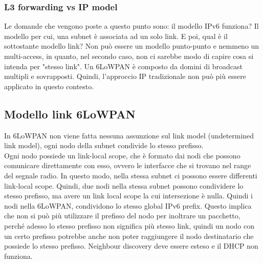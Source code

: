 \documentclass{article}
\begin{document}
\subsubsection{L3 forwarding vs IP model}
Le domande che vengono poste a questo punto sono: il modello IPv6 funziona? Il modello per cui, una subnet è associata ad un solo link. E poi, qual è il sottostante modello link? Non può essere un modello punto-punto e nemmeno un multi-access, in quanto, nel secondo caso, non ci sarebbe modo di capire cosa si intenda per "stesso link". Un 6LoWPAN è composto da domini di broadcast multipli e sovrapposti. Quindi, l'approccio IP tradizionale non può più essere applicato in questo contesto. 

\subsection{Modello link 6LoWPAN}
In 6LoWPAN non viene fatta nessuna assunzione sul link model (undetermined link model), ogni nodo della subnet condivide lo stesso prefisso. \\ Ogni nodo possiede un link-local scope, che è formato dai nodi che possono comunicare direttamente con esso, ovvero le interfacce che si trovano nel range del segnale radio. In questo modo, nella stessa subnet ci possono essere differenti link-local scope. Quindi, due nodi nella stessa subnet possono condividere lo stesso prefisso, ma avere un link local scope la cui intersezione è nulla. Quindi i nodi nella 6LoWPAN, condividono lo stesso global IPv6 prefix. Questo implica che non si può più utilizzare il prefisso del nodo per inoltrare un pacchetto, perché adesso lo stesso prefisso non significa più stesso link, quindi un nodo con un certo prefisso potrebbe anche non poter raggiungere il nodo destinatario che possiede lo stesso prefisso. Neighbour discovery deve essere esteso e il DHCP non funziona.
\end{document}
